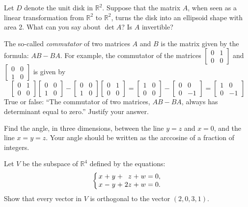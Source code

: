 \documentclass[addpoints]{exam}
\newcommand{\R}{\mathbb{R}}
\begin{document}
\begin{questions}

\question[5] Let $D$ denote the unit disk in $\R^2$. Suppose that the matrix $A$, when seen as a linear transformation from $\R^2$ to $\R^2$, turns the disk into an ellipsoid shape with area 2. What can you say about $\det A$? Is $A$ invertible?

\question[5] The so-called \emph{commutator} of two matrices $A$ and $B$ is the matrix given by the formula: $AB-BA$. For example, the commutator of the matrices $\left[\begin{smallmatrix}0&1\\0&0\end{smallmatrix}\right]$ and $\left[\begin{smallmatrix}0&0\\1&0\end{smallmatrix}\right]$ is given by
\[\begin{bmatrix}0&1\\0&0\end{bmatrix}\begin{bmatrix}0&0\\1&0\end{bmatrix}
-\begin{bmatrix}0&0\\1&0\end{bmatrix}\begin{bmatrix}0&1\\0&0\end{bmatrix}
=\begin{bmatrix}1&0\\0&0\end{bmatrix}-\begin{bmatrix}0&0\\0&-1\end{bmatrix}=\begin{bmatrix}1&0\\0&-1\end{bmatrix}\]
 True or false: ``The commutator of two matrices, $AB-BA$, always has determinant equal to zero.'' Justify your answer.
 
\question[5] Find the angle, in three dimensions, between the line $y=z$ and $x=0$, and the line $x=y=z$. Your angle should be written as the arccosine of a fraction of integers.

\question[5] Let $V$ be the subspace of $\R^4$ defined by the equations:
\[\left\{
\arraycolsep=1.4pt
\begin{array}{rrrrrrrrrr}
x&+&y&+&z&+&w&=&0,\\
x&-&y&+&2z&+&w&=&0.
\end{array}
\right.\]
Show that every vector in $V$ is orthogonal to the vector $(2,0,3,1)$.



\end{questions}
\end{document}
